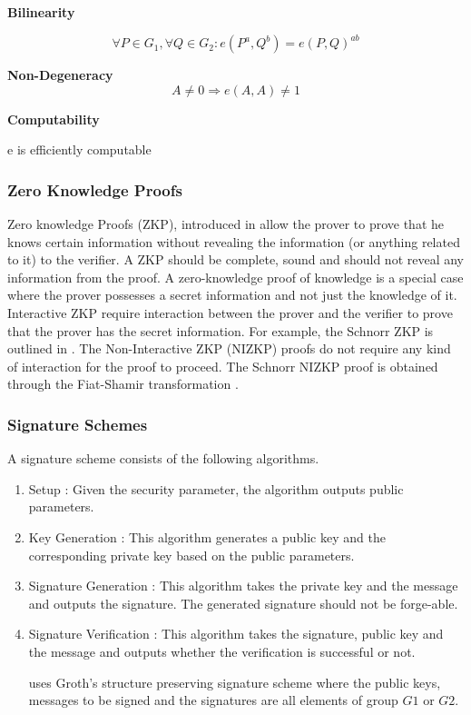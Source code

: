 \documentclass[journal]{IEEEtran}
\begin{document}
\textbf{Bilinearity}

$$\forall P \in G_1, \forall Q \in G_2 : e(P^a, Q^b) = e(P,Q)^{ab}$$

\textbf{Non-Degeneracy}
$$ A \neq 0 \Rightarrow e(A,A) \neq 1$$

\textbf{Computability}

\HS\HS\HS\HS \HS\HS e is efficiently computable


\subsubsection{Zero Knowledge Proofs}
Zero knowledge Proofs (ZKP), introduced in \cite{zkp} allow the prover to prove that he knows certain information without revealing the information (or anything related to it) to the verifier. A ZKP should be complete, sound and should not reveal any information from the proof. A zero-knowledge proof of knowledge is a special case where the prover possesses a secret information and not just the knowledge of it. Interactive ZKP require interaction between the prover and the verifier to prove that the prover has the secret information. For example, the Schnorr ZKP is outlined in \cite{rfc8235}. The Non-Interactive ZKP (NIZKP) proofs do not require any kind of interaction for the proof to proceed. The Schnorr NIZKP proof is obtained through the Fiat-Shamir transformation \cite{Fiat1986HowTP}.

\subsubsection{Signature Schemes}
A signature scheme consists of the following algorithms.
\begin{enumerate}[label=\alph*)]
	\item Setup : Given the security parameter, the algorithm outputs public parameters.
	\item Key Generation : This algorithm generates a public key and the corresponding private key based on the public parameters.
	\item Signature Generation : This algorithm takes the private key and the message and outputs the signature. The generated signature should not be forge-able.
	\item Signature Verification : This algorithm takes the signature, public key and the message and outputs whether the verification is successful or not.
	
\cite{CamenischDD17} uses Groth's structure preserving signature scheme \cite{groth} where the public keys, messages to be signed and the signatures are all elements of group $G1$ or $G2$.

\end{enumerate}
\end{document}
